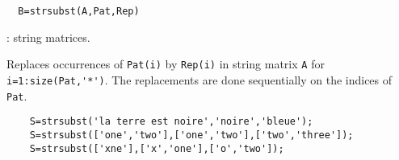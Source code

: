 
\begin{mandesc}
\end{mandesc}
\begin{calling_sequence}
\begin{verbatim}
  B=strsubst(A,Pat,Rep)
\end{verbatim}
\end{calling_sequence}

\begin{parameters}
  \begin{varlist}
    : string matrices.
  \end{varlist}
\end{parameters}

\begin{mandescription}
  Replaces occurrences of \verb+Pat(i)+ by \verb+Rep(i)+ in string matrix \verb+A+ for \verb+i=1:size(Pat,'*')+. 
  The replacements are done sequentially on the indices of \verb+Pat+.
\end{mandescription}

\begin{examples}
  \begin{Verbatim}
    S=strsubst('la terre est noire','noire','bleue');
    S=strsubst(['one','two'],['one','two'],['two','three']); 
    S=strsubst(['xne'],['x','one'],['o','two']);
  \end{Verbatim}
\end{examples}

